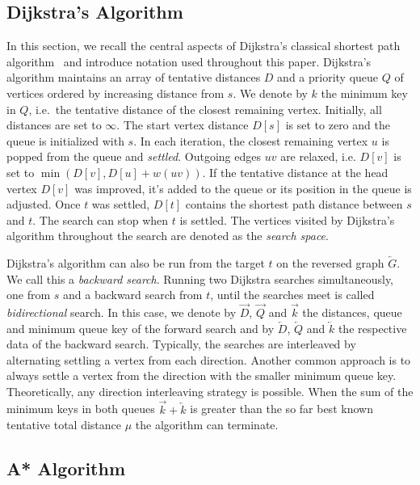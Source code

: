 \documentclass[manuscript,review]{acmart}
\begin{document}
\subsection{Dijkstra's Algorithm}

In this section, we recall the central aspects of Dijkstra's classical shortest path algorithm~\cite{d-ntpcg-59} and introduce notation used throughout this paper.
Dijkstra's algorithm maintains an array of tentative distances $D$ and a priority queue $Q$ of vertices ordered by increasing distance from $s$.
We denote by $k$ the minimum key in $Q$, i.e.\ the tentative distance of the closest remaining vertex.
Initially, all distances are set to $\infty$.
The start vertex distance $D[s]$ is set to zero and the queue is initialized with $s$.
In each iteration, the closest remaining vertex $u$ is popped from the queue and \emph{settled}.
Outgoing edges $uv$ are relaxed, i.e. $D[v]$ is set to $\min(D[v], D[u] + w(uv))$.
If the tentative distance at the head vertex $D[v]$ was improved, it's added to the queue or its position in the queue is adjusted.
Once $t$ was settled, $D[t]$ contains the shortest path distance between $s$ and $t$.
The search can stop when $t$ is settled.
The vertices visited by Dijkstra's algorithm throughout the search are denoted as the \emph{search space}.

Dijkstra's algorithm can also be run from the target $t$ on the reversed graph $\overleftarrow{G}$.
We call this a \emph{backward search}.
Running two Dijkstra searches simultaneously, one from $s$ and a backward search from $t$, until the searches meet is called \emph{bidirectional} search.
In this case, we denote by $\overrightarrow{D}$, $\overrightarrow{Q}$ and $\overrightarrow{k}$ the distances, queue and minimum queue key of the forward search and by $\overleftarrow{D}$, $\overleftarrow{Q}$ and $\overleftarrow{k}$ the respective data of the backward search.
Typically, the searches are interleaved by alternating settling a vertex from each direction.
Another common approach is to always settle a vertex from the direction with the smaller minimum queue key.
Theoretically, any direction interleaving strategy is possible.
When the sum of the minimum keys in both queues $\overrightarrow{k} + \overleftarrow{k}$ is greater than the so far best known tentative total distance $\mu$ the algorithm can terminate.

\subsection{A* Algorithm}\label{sec:a_star}
\end{document}
